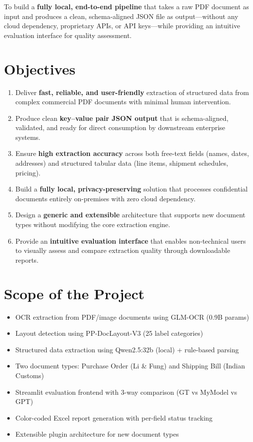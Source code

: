 \documentclass[12pt,a4paper]{report}
\begin{document}
To build a \textbf{fully local, end-to-end pipeline} that takes a raw PDF document as input and produces a clean, schema-aligned JSON file as output---without any cloud dependency, proprietary APIs, or API keys---while providing an intuitive evaluation interface for quality assessment.

\section{Objectives}

\begin{enumerate}[nosep]
    \item Deliver \textbf{fast, reliable, and user-friendly} extraction of structured data from complex commercial PDF documents with minimal human intervention.
    \item Produce clean \textbf{key--value pair JSON output} that is schema-aligned, validated, and ready for direct consumption by downstream enterprise systems.
    \item Ensure \textbf{high extraction accuracy} across both free-text fields (names, dates, addresses) and structured tabular data (line items, shipment schedules, pricing).
    \item Build a \textbf{fully local, privacy-preserving} solution that processes confidential documents entirely on-premises with zero cloud dependency.
    \item Design a \textbf{generic and extensible} architecture that supports new document types without modifying the core extraction engine.
    \item Provide an \textbf{intuitive evaluation interface} that enables non-technical users to visually assess and compare extraction quality through downloadable reports.
\end{enumerate}

\section{Scope of the Project}

\begin{scopebox}[In Scope]
\begin{itemize}[nosep]
    \item OCR extraction from PDF/image documents using GLM-OCR (0.9B params)
    \item Layout detection using PP-DocLayout-V3 (25 label categories)
    \item Structured data extraction using Qwen2.5:32b (local) + rule-based parsing
    \item Two document types: Purchase Order (Li \& Fung) and Shipping Bill (Indian Customs)
    \item Streamlit evaluation frontend with 3-way comparison (GT vs MyModel vs GPT)
    \item Color-coded Excel report generation with per-field status tracking
    \item Extensible plugin architecture for new document types
\end{itemize}
\end{scopebox}
\end{document}
